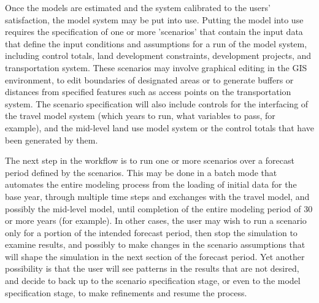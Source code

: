 Once the models are estimated and the system calibrated to the users' satisfaction, the model system may be put into use. Putting
the model into use requires the specification of one or more 'scenarios' that contain the input data that define the input conditions
and assumptions for a run of the model system, including control totals, land development constraints, development projects, and
transportation system.  These scenarios may involve graphical editing in the GIS environment, to edit boundaries of designated areas
or to generate buffers or distances from specified features such as access points on the transportation system.  The scenario
specification will also include controls for the interfacing of the travel model system (which years to run, what variables to pass,
for example), and the mid-level land use model system or the control totals that have been generated by them.

The next step in the workflow is to run one or more scenarios over a forecast period defined by the scenarios.  This may be done in
a batch mode that automates the entire modeling process from the loading of initial data for the base year, through multiple time
steps and exchanges with the travel model, and possibly the mid-level model, until completion of the entire modeling period of 30
or more years (for example).  In other cases, the user may wish to run a scenario only for a portion of the intended forecast period,
then stop the simulation to examine results, and possibly to make changes in the scenario assumptions that will shape the simulation
in the next section of the forecast period.  Yet another possibility is that the user will see patterns in the results that are not
desired, and decide to back up to the scenario specification stage, or even to the model specification stage, to make refinements
and resume the process.

